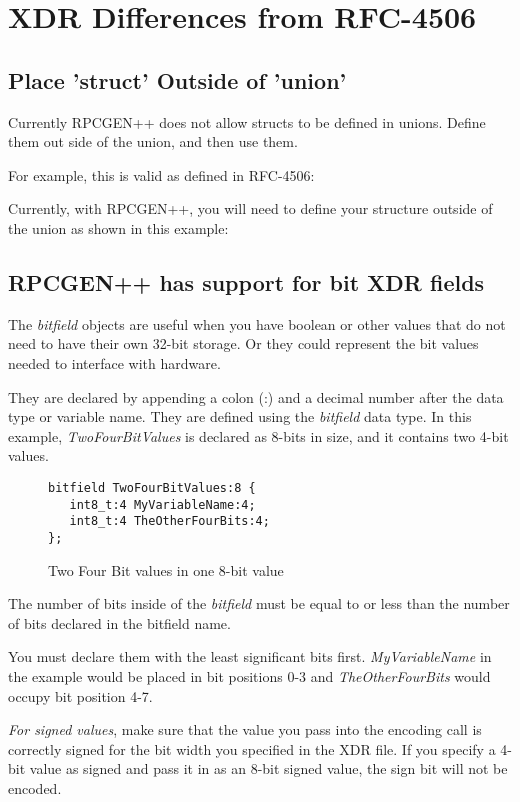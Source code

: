 \section{XDR Differences from RFC-4506}
\subsection{Place 'struct' Outside of 'union'}
Currently RPCGEN++ does not allow structs to be defined in unions.
Define them out side of the union, and then use them.

For example, this is valid as defined in RFC-4506:


Currently, with RPCGEN++, you will need to define your
structure outside of the union as shown in this example:


\subsection{RPCGEN++ has support for bit XDR fields}
The \textit{bitfield} objects are useful when you have boolean or other
values that do not need to have their own 32-bit storage.
Or they could represent the bit values needed to interface
with hardware.

They are declared by appending a colon (:) and a decimal number
after the data type or variable name.
They are defined using the \textit{bitfield} data type.
In this example, \textit{TwoFourBitValues} is declared
as 8-bits in size, and it contains two 4-bit values.
\begin{figure}
\begin{verbatim}
bitfield TwoFourBitValues:8 {
   int8_t:4 MyVariableName:4;
   int8_t:4 TheOtherFourBits:4;
};
\end{verbatim}
\caption{Two Four Bit values in one 8-bit value}
\label{fig:A32BitExampleXDR}
\end{figure}

The number of bits inside of the \textit{bitfield} must be equal to or
less than the number of bits declared in the bitfield name.

You must declare them with the least significant bits first.
\textit{MyVariableName} in the example would be placed in
bit positions 0-3 and \textit{TheOtherFourBits} would occupy
bit position 4-7.

\textit{For signed values}, make sure that the value you pass
into the encoding call is correctly signed for the bit
width you specified in the XDR file.
If you specify a 4-bit value as signed
and pass it in as an 8-bit signed value, the sign bit will not
be encoded.

